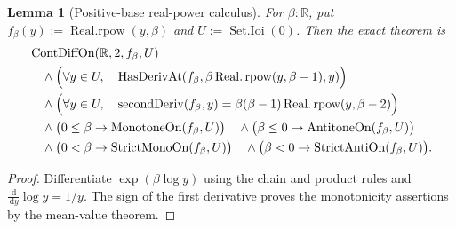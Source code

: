 \documentclass[9pt]{extarticle}
\newtheorem{lemma}{Lemma}[section]
\theoremstyle{definition}
\theoremstyle{remark}
\newcommand{\R}{\mathbb R}
\newcommand{\dd}{\,\mathrm d}
\begin{document}
\begin{lemma}[Positive-base real-power calculus]
\label{lem:real-rpow-calculus}
For $\beta:\R$, put
$f_\beta(y):=\operatorname{Real.rpow}(y,\beta)$ and
$U:=\operatorname{Set.Ioi}(0)$.  Then the exact theorem is
\begin{align*}
 &\operatorname{ContDiffOn}(\R,2,f_\beta,U)\\
 &\quad\wedge
 \Bigl(\forall y\in U,\quad
  \operatorname{HasDerivAt}
   (f_\beta,\beta\operatorname{Real.rpow}(y,\beta-1),y)\Bigr)\\
 &\quad\wedge
 \Bigl(\forall y\in U,\quad
  \operatorname{secondDeriv}(f_\beta,y)
   =\beta(\beta-1)\operatorname{Real.rpow}(y,\beta-2)\Bigr)\\
 &\quad\wedge
 \bigl(0\leq\beta\to\operatorname{MonotoneOn}(f_\beta,U)\bigr)
 \quad\wedge
 \bigl(\beta\leq0\to\operatorname{AntitoneOn}(f_\beta,U)\bigr)\\
 &\quad\wedge
 \bigl(0<\beta\to\operatorname{StrictMonoOn}(f_\beta,U)\bigr)
 \quad\wedge
 \bigl(\beta<0\to\operatorname{StrictAntiOn}(f_\beta,U)\bigr).
\end{align*}
\end{lemma}

\begin{proof}
Differentiate $\exp(\beta\log y)$ using the chain and product rules and
$\frac{\dd}{\dd y}\log y=1/y$.  The sign of the first derivative proves
the monotonicity assertions by the mean-value theorem.
\end{proof}
\end{document}

